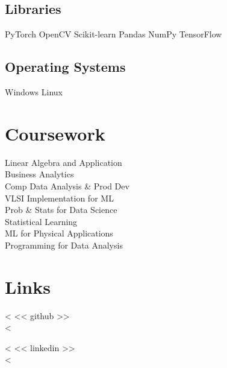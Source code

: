 \documentclass[letterpaper]{deedy-resume}
\begin{document}
\begin{minipage}[t]{0.24\textwidth}
\subsection{Libraries}
PyTorch \textbullet{} OpenCV \textbullet{} Scikit-learn \textbullet{} Pandas \textbullet{} NumPy \textbullet{} TensorFlow
\sectionspace
\subsection{Operating Systems}
Windows \textbullet{} Linux 

\sectionspace




\section{Coursework}





Linear Algebra and Application  \\
Business Analytics \\
Comp Data Analysis \& Prod Dev \\
VLSI Implementation for ML \\
Prob \& Stats for Data Science \\
Statistical Learning\\
ML for Physical Applications\\
Programming for Data Analysis

\sectionspace 



\section{Links} 
<%
<< github >>\\
<%

<%
<< linkedin >> \\
<%

\sectionspace 


\end{minipage} %
\end{document}
